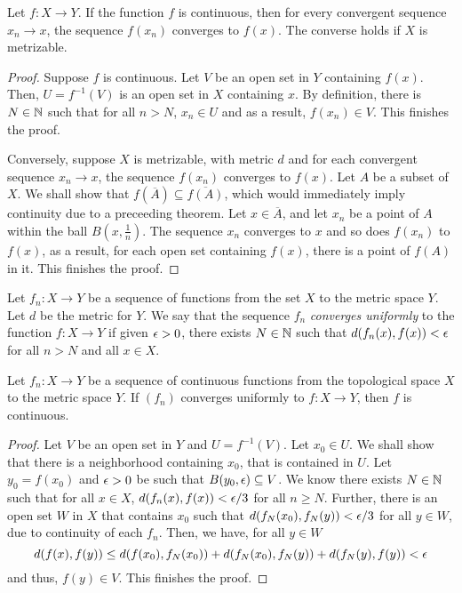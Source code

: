 \begin{theorem}
    Let $f:X\to Y$. If the function $f$ is continuous, then for every convergent sequence $x_n\to x$, the sequence $f(x_n)$ converges to $f(x)$. The converse holds if $X$ is metrizable.
\end{theorem}
\begin{proof}
    Suppose $f$ is continuous. Let $V$ be an open set in $Y$ containing $f(x)$. Then, $U = f^{-1}(V)$ is an open set in $X$ containing $x$. By definition, there is $N\in\mathbb{N}$ such that for all $n > N$, $x_n\in U$ and as a result, $f(x_n)\in V$. This finishes the proof.

    Conversely, suppose $X$ is metrizable, with metric $d$ and for each convergent sequence $x_n\to x$, the sequence $f(x_n)$ converges to $f(x)$. Let $A$ be a subset of $X$. We shall show that $f(\overline{A})\subseteq\overline{f(A)}$, which would immediately imply continuity due to a preceeding theorem. Let $x\in\overline{A}$, and let $x_n$ be a point of $A$ within the ball $B(x,\frac{1}{n})$. The sequence $x_n$ converges to $x$ and so does $f(x_n)$ to $f(x)$, as a result, for each open set containing $f(x)$, there is a point of $f(A)$ in it. This finishes the proof.
\end{proof}

\begin{definition}
    Let $f_n:X\to Y$ be a sequence of functions from the set $X$ to the metric space $Y$. Let $d$ be the metric for $Y$. We say that the sequence $f_n$ \textit{converges uniformly} to the function $f:X\to Y$ if given $\epsilon > 0$, there exists $N\in\mathbb{N}$ such that $d(f_n(x), f(x)) < \epsilon$ for all $n > N$ and all $x\in X$.
\end{definition}

\begin{theorem}
    Let $f_n:X\to Y$ be a sequence of continuous functions from the topological space $X$ to the metric space $Y$. If $(f_n)$ converges uniformly to $f:X\to Y$, then $f$ is continuous.
\end{theorem}
\begin{proof}
    Let $V$ be an open set in $Y$ and $U = f^{-1}(V)$. Let $x_0\in U$. We shall show that there is a neighborhood containing $x_0$, that is contained in $U$. Let $y_0 = f(x_0)$ and $\epsilon > 0$ be such that $B(y_0,\epsilon)\subseteq V$. We know there exists $N\in\mathbb{N}$ such that for all $x\in X$, $d(f_n(x), f(x)) < \epsilon/3$ for all $n\ge N$. Further, there is an open set $W$ in $X$ that contains $x_0$ such that $d(f_N(x_0), f_N(y)) < \epsilon/3$ for all $y\in W$, due to continuity of each $f_n$. Then, we have, for all $y\in W$
    \begin{equation*}
        d(f(x), f(y))\le d(f(x_0), f_N(x_0)) + d(f_N(x_0), f_N(y)) + d(f_N(y), f(y)) < \epsilon
    \end{equation*}
    and thus, $f(y)\in V$. This finishes the proof.
\end{proof}